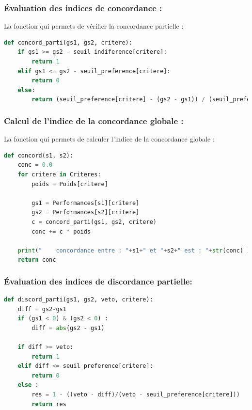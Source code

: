 \subsubsection{Évaluation des indices de concordance :}
La fonction qui permets de vérifier la concordance partielle :
\begin{lstlisting}[language=Python, frame=single, firstnumber=127]
def concord_parti(gs1, gs2, critere):
    if gs1 >= gs2 - seuil_indiference[critere]:  
        return 1
    elif gs1 <= gs2 - seuil_preference[critere]:  
        return 0
    else:
        return (seuil_preference[critere] - (gs2 - gs1)) / (seuil_preference[critere] - seuil_indiference[critere])
\end{lstlisting}

\subsubsection{Calcul de l’indice de la concordance globale :}
La fonction qui permets de calculer l’indice de la concordance globale :

\begin{lstlisting}[language=Python, frame=single, firstnumber=137]
def concord(s1, s2):
    conc = 0.0
    for critere in Criteres:
        poids = Poids[critere]
        
        gs1 = Performances[s1][critere]
        gs2 = Performances[s2][critere]
        c = concord_parti(gs1, gs2, critere)
        conc += c * poids
        
    print("    concordance entre : "+s1+" et "+s2+" est : "+str(conc) )
    return conc  
\end{lstlisting}

\subsubsection{Évaluation des indices de discordance partielle:}
\begin{lstlisting}[language=Python, frame=single, firstnumber=90]
def discord_parti(gs1, gs2, veto, critere):
    diff = gs2-gs1
    if (gs1 < 0) & (gs2 < 0) :
        diff = abs(gs2 - gs1)
        
    if diff >= veto:
        return 1
    elif diff <= seuil_preference[critere]:
        return 0
    else :
        res = 1 - ((veto - diff)/(veto - seuil_preference[critere]))
        return res
\end{lstlisting}

\newpage

